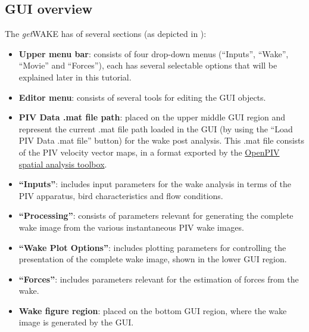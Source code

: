 \documentclass[12pt,a4paper]{article}
\begin{document}
\newpage
\subsection{GUI overview}

The \textit{get}WAKE has of several sections (as depicted in ):
\begin{itemize}
\item {\color{red}\textbf{Upper menu bar}}: consists of four drop-down menus (``Inputs'', ``Wake'', ``Movie'' and ``Forces''), each has several selectable options that will be explained later in this tutorial.
\item {\color{cyan}\textbf{Editor menu}}: consists of several tools for editing the GUI objects.
\item {\color{blue}\textbf{PIV Data .mat file path}}: placed on the upper middle GUI region and represent the current .mat file path loaded in the GUI (by using the ``Load PIV Data .mat file'' button) for the wake post analysis. This .mat file consists of the PIV velocity vector maps, in a format exported by the \href{https://github.com/OpenPIV/openpiv-spatial-analysis-toolbox}{OpenPIV spatial analysis toolbox}.
\item {\color{brown}\textbf{``Inputs''}}: includes input parameters for the wake analysis in terms of the PIV apparatus, bird characteristics and flow conditions.
\item {\color{green}\textbf{``Processing''}}: consists of parameters relevant for generating the complete wake image from the various instantaneous PIV wake images.
\item {\color{magenta}\textbf{``Wake Plot Options''}}: includes plotting parameters for controlling the presentation of the complete wake image, shown in the lower GUI region.
\item {\color{orange}\textbf{``Forces''}}: includes parameters relevant for the estimation of forces from the wake.
\item {\color{black}\textbf{Wake figure region}}: placed on the bottom GUI region, where the wake image is generated by the GUI.
\end{itemize}
\end{document}
